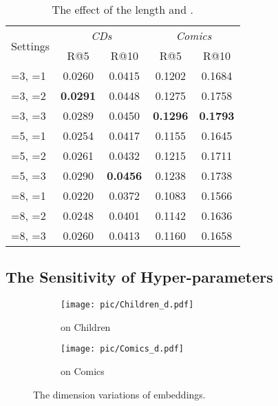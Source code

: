 \documentclass[sigconf]{acmart}
\begin{document}
\begin{table}[ht]
\centering
\caption{\label{tab:L_and_T}The effect of the length  and .}
\begin{tabular}{ |l|c|c|c|c| }
\hline
\multirow{2}{*}{Settings} & \multicolumn{2}{c|}{\textit{CDs}} & \multicolumn{2}{c|}{\textit{Comics}} \bigstrut \\\cline{2-5} 
& R@5 & R@10 & R@5 & R@10 \bigstrut \\ 
\hline
=3, =1 & 0.0260 & 0.0415 & 0.1202 & 0.1684 \\
=3, =2 & \textbf{0.0291} & 0.0448 & 0.1275 & 0.1758 \\
=3, =3 & 0.0289 & 0.0450 & \textbf{0.1296} & \textbf{0.1793} \\
=5, =1 & 0.0254 & 0.0417 & 0.1155 & 0.1645 \\
=5, =2 & 0.0261 & 0.0432 & 0.1215 & 0.1711 \\
=5, =3 & 0.0290 & \textbf{0.0456} & 0.1238 & 0.1738 \\
=8, =1 & 0.0220 & 0.0372 & 0.1083 & 0.1566 \\
=8, =2 & 0.0248 & 0.0401 & 0.1142 & 0.1636 \\
=8, =3 & 0.0260 & 0.0413 & 0.1160 & 0.1658 \\
\hline
\end{tabular}
\vspace{-0.3cm}
\end{table}

\subsection{The Sensitivity of Hyper-parameters} \label{subsec:parameter_sensitivity}

\begin{figure}[t!]
    \centering
    \begin{subfigure}[t]{0.25\textwidth}
        \centering
        \texttt{[image: pic/Children\_d.pdf]}
        \caption{\label{fig:CDs_da_var} on Children}
    \end{subfigure}\begin{subfigure}[t]{0.25\textwidth}
        \centering
        \texttt{[image: pic/Comics\_d.pdf]}
        \caption{\label{fig:Foursquare_da_var} on Comics}
    \end{subfigure}
    \caption{\label{fig:d_var}The dimension variations of embeddings.}
\vspace{-0.3cm}
\end{figure}
\end{document}
